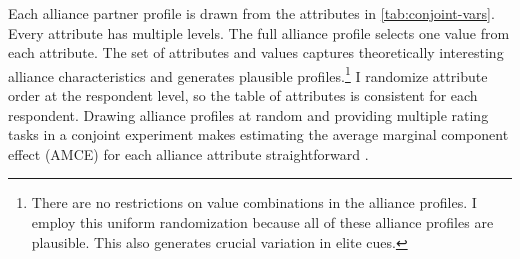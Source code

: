 \documentclass[12pt]{article}
\begin{document}
Each alliance partner profile is drawn from the attributes in \autoref{tab:conjoint-vars}.
Every attribute has multiple levels.
The full alliance profile selects one value from each attribute. 
The set of attributes and values captures theoretically interesting alliance characteristics and generates plausible profiles.\footnote{There are no restrictions on value combinations in the alliance profiles. I employ this uniform randomization because all of these alliance profiles are plausible. This also generates crucial variation in elite cues.}
I randomize attribute order at the respondent level, so the table of attributes is consistent for each respondent. 
Drawing alliance profiles at random and providing multiple rating tasks in a conjoint experiment makes estimating the average marginal component effect (AMCE) for each alliance attribute straightforward \citep{Hainmuelleretal2014}. 
\end{document}
